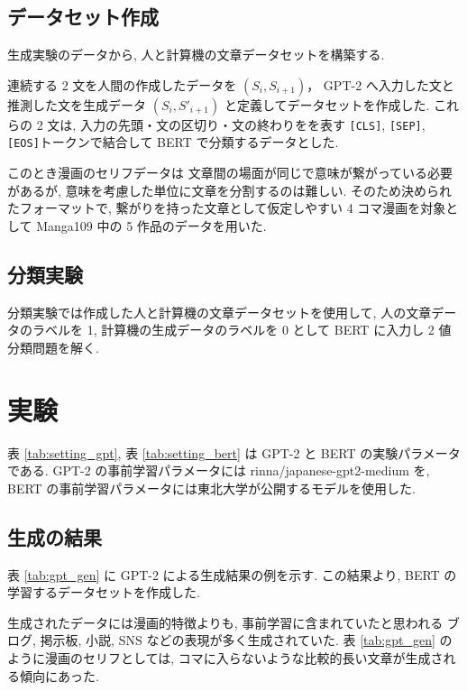 \documentclass[twocolumn]{jarticle}     %
\begin{document}
\subsection{データセット作成}

生成実験のデータから, 人と計算機の文章データセットを構築する.

連続する 2 文を人間の作成したデータを $(S_i, S_{i+1})$，
GPT-2 へ入力した文と推測した文を生成データ $(S_i, S'_{i+1})$
と定義してデータセットを作成した.
これらの 2 文は, 入力の先頭・文の区切り・文の終わりをを表す \verb|[CLS]|, \verb|[SEP]|, \verb|[EOS]|トークンで結合して BERT で分類するデータとした.

このとき漫画のセリフデータは
文章間の場面が同じで意味が繋がっている必要があるが, 意味を考慮した単位に文章を分割するのは難しい.
そのため決められたフォーマットで, 繋がりを持った文章として仮定しやすい 4 コマ漫画を対象として
Manga109 中の 5 作品のデータを用いた.

\subsection{分類実験}
分類実験では作成した人と計算機の文章データセットを使用して, 人の文章データのラベルを 1, 計算機の生成データのラベルを 0 として BERT に入力し 2 値分類問題を解く.



\section{実験}

表 \ref{tab:setting_gpt}, 表 \ref{tab:setting_bert} は GPT-2 と BERT の実験パラメータである.
GPT-2 の事前学習パラメータには rinna/japanese-gpt2-medium を, BERT の事前学習パラメータには東北大学が公開するモデルを使用した.


\subsection{生成の結果}

表 \ref{tab:gpt_gen} に GPT-2 による生成結果の例を示す.
この結果より, BERT の学習するデータセットを作成した.

生成されたデータには漫画的特徴よりも, 事前学習に含まれていたと思われる ブログ, 掲示板, 小説, SNS などの表現が多く生成されていた.
表 \ref{tab:gpt_gen} のように漫画のセリフとしては, コマに入らないような比較的長い文章が生成される傾向にあった.
\end{document}
